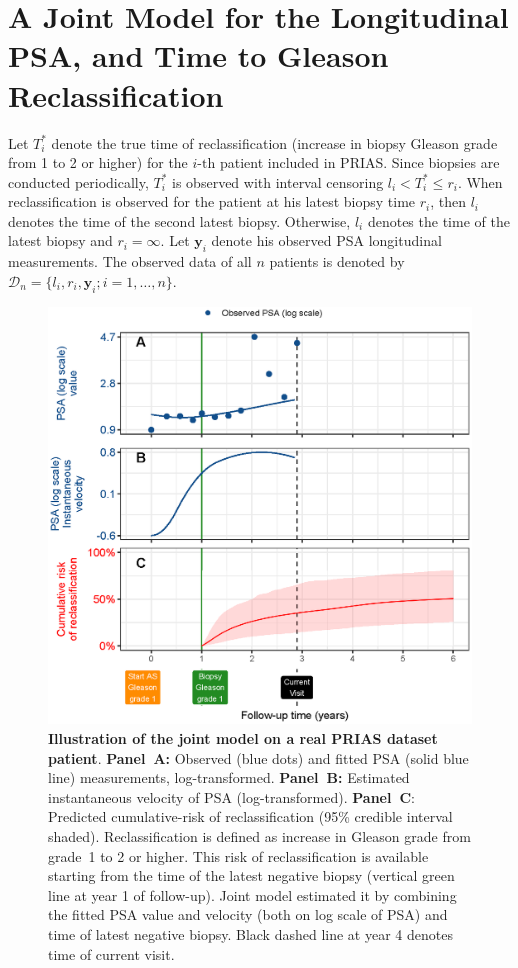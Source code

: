 \section{A Joint Model for the Longitudinal PSA, and Time to Gleason Reclassification}
\label{sec:jm_framework}

Let $T_i^*$ denote the true time of reclassification (increase in biopsy Gleason grade from 1 to 2 or higher) for the ${i\mbox{-th}}$ patient included in PRIAS. Since biopsies are conducted periodically, $T_i^*$ is observed with interval censoring ${l_i < T_i^* \leq r_i}$. When reclassification is observed for the patient at his latest biopsy time $r_i$, then $l_i$ denotes the time of the second latest biopsy. Otherwise, $l_i$ denotes the time of the latest biopsy and ${r_i=\infty}$. Let $\boldsymbol{y}_{i}$ denote his observed PSA longitudinal measurements. The observed data of all $n$ patients is denoted by ${\mathcal{D}_n = \{l_i, r_i, \boldsymbol{y}_{i}; i = 1, \ldots, n\}}$.

\begin{figure}
\centerline{\includegraphics[width=\columnwidth]{images/jmExplanationPlot_113.eps}}
\caption{\textbf{Illustration of the joint model on a real PRIAS dataset patient}. \textbf{Panel~A:} Observed (blue dots) and fitted PSA (solid blue line) measurements, log-transformed. \textbf{Panel~B:} Estimated instantaneous velocity of PSA (log-transformed). \textbf{Panel~C}: Predicted cumulative-risk of reclassification (95\% credible interval shaded). Reclassification is defined as increase in Gleason grade \citep{epsteinGG2014} from grade~1 to 2 or higher. This risk of reclassification is available starting from the time of the latest negative biopsy (vertical green line at year 1 of follow-up). Joint model estimated it by combining the fitted PSA value and velocity (both on log scale of PSA) and time of latest negative biopsy. Black dashed line at year 4 denotes time of current visit.}
\label{fig:jmExplanationPlot_113}
\end{figure}

